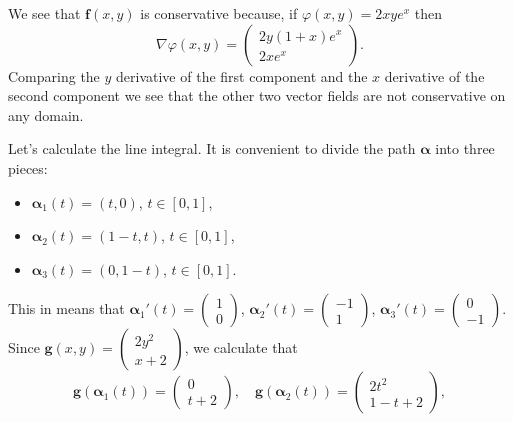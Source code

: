 \begin{solution}
    We see that \(\mathbf{f}(x,y)\) is conservative because, if \(\varphi (x,y) = 2xy e^x \) then
    \[
        \nabla \varphi (x,y) = \begin{pmatrix}
            2y(1 + x )e^x \\ 2 x e^x
        \end{pmatrix}.
    \]
    Comparing the \(y\) derivative of the first component and the \(x\) derivative of the second component we see that the other two vector fields are not conservative on any domain.

    Let's calculate the line integral.
    It is convenient to divide the path \(\boldsymbol{\alpha}\) into three pieces:
    \begin{itemize}
        \item   \(\boldsymbol{\alpha}_1(t) = (t,0)\), \(t\in[0,1]\),
        \item   \(\boldsymbol{\alpha}_2(t) = (1-t,t)\), \(t\in[0,1]\),
        \item   \(\boldsymbol{\alpha}_3(t) = (0,1-t)\), \(t\in[0,1]\).
    \end{itemize}
    This in means that
    \(\boldsymbol{\alpha}_1'(t) = \left(\begin{smallmatrix}  1 \\ 0  \end{smallmatrix}\right)\),
    \(\boldsymbol{\alpha}_2'(t) =  \left(\begin{smallmatrix}  -1 \\ 1  \end{smallmatrix}\right)\),
    \(\boldsymbol{\alpha}_3'(t) =  \left(\begin{smallmatrix}  0 \\ -1  \end{smallmatrix}\right)\).
    Since
    \(\mathbf{g}(x,y) =
    \left(\begin{smallmatrix}
        2 y^2 \\ x + 2
    \end{smallmatrix}\right)\), we calculate that
    \[
        \mathbf{g}(\boldsymbol{\alpha}_1(t)) =
        \left(\begin{smallmatrix}
            0 \\ t + 2
        \end{smallmatrix}\right),
        \quad
        \mathbf{g}(\boldsymbol{\alpha}_2(t)) =
        \left(\begin{smallmatrix}
            2 t^2 \\ 1 - t + 2
        \end{smallmatrix}\right),
\]
\end{solution}
